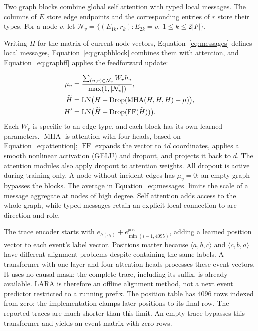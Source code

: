 Two graph blocks combine global self attention with typed local messages. The columns of $E$ store edge endpoints and the corresponding entries of $r$ store their types. For a node $v$, let $\mathcal N_v=\{(E_{1k},r_k):E_{2k}=v,\ 1\leq k\leq2|F|\}$. \begin{revised}Writing $H$ for the matrix of current node vectors, Equation~\eqref{eq:messages} defines local messages, Equation~\eqref{eq:graphblock} combines them with attention, and Equation~\eqref{eq:graphff} applies the feedforward update:\end{revised}
\begin{align}
 \mu_v&=\frac{\sum_{(u,r)\in\mathcal N_v}W_rh_u}{\max(1,|\mathcal N_v|)},\label{eq:messages}\\
 \widetilde H&=\operatorname{LN}\bigl(H+\operatorname{Drop}(\operatorname{MHA}(H,H,H)+\mu)\bigr),\label{eq:graphblock}\\
 H'&=\operatorname{LN}\bigl(\widetilde H+\operatorname{Drop}(\operatorname{FF}(\widetilde H))\bigr).\label{eq:graphff}
\end{align}
Each $W_r$ is specific to an edge type, and each block has its own learned parameters. $\operatorname{MHA}$ is attention with four heads, based on Equation~\eqref{eq:attention}; $\operatorname{FF}$ expands the vector to $4d$ coordinates, applies a smooth nonlinear activation (GELU) and dropout, and projects it back to $d$. The attention modules also apply dropout to attention weights. All dropout is active during training only. A node without incident edges has $\mu_v=0$; an empty graph bypasses the blocks. The average in Equation~\eqref{eq:messages} limits the scale of a message aggregate at nodes of high degree. Self attention adds access to the whole graph, while typed messages retain an explicit local connection to arc direction and role.

The trace encoder starts with $e_{h(a_i)}+e_{\min(i-1,4095)}^{\mathrm{pos}}$, adding a learned position vector to each event's label vector. Positions matter because $\langle a,b,c\rangle$ and $\langle c,b,a\rangle$ have different alignment problems despite containing the same labels. A transformer with one layer and four attention heads processes these event vectors. It uses no causal mask: the complete trace, including its suffix, is already available. LARA is therefore an offline alignment method, not a next event predictor restricted to a running prefix. The position table has 4096 rows indexed from zero; the implementation clamps later positions to its final row. The reported traces are much shorter than this limit. An empty trace bypasses this transformer and yields an event matrix with zero rows.

